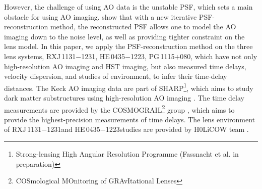 \documentclass[useAMS,usenatbib]{mnras}
\newcommand\rxj{RXJ\,1131$-$1231}
\newcommand\he{HE\,0435$-$1223}
\newcommand\pg{PG\,1115$+$080}
\begin{document}
However, the challenge of using AO data is the unstable PSF, which sets a main obstacle for using AO imaging. %
\citet{GChenEtal16} show that with a new iterative PSF-reconstruction method, the reconstructed PSF allows one to model the AO imaging down to the noise level, as well as providing tighter constraint on the lens model. 
In this paper, we apply the PSF-reconstruction method on the three lens systems, \rxj, \he, \pg, which have not only high-resolution AO imaging and HST imaging, but also measured time delays, velocity dispersion, and studies of environment, to infer their time-delay distances. 
The Keck AO imaging data are part of SHARP\footnote{Strong-lensing High Angular Resolution Programme (Fassnacht et al. in preparation)}, which aims to study dark matter substructures using high-resolution AO imaging \citep[e.g.,][]{Lagattuta10,Lagattuta12,Vegetti12,Hsueh16,HsuehEtal17_Illustris,HsuehEtal17_edgeon}.
The time delay measurements are provided by the COSMOGRAIL\footnote{COSmological MOnitoring of GRAvItational Lenses} group \citep[e.g.,][]{CourbinEtal05,VuissozEtal07,VuissozEtal08,CourbinEtal11,TewesEtal13b,TewesEtal13a,RathnaEtal13,BonvinEtal17}, which aims to provide the highest-precision measurements of time delays. The lens environment of \rxj and \he studies are provided by H0LiCOW team \citep{SuyuEtal14,SluseEtal17,RusuEtal17}.
\end{document}
